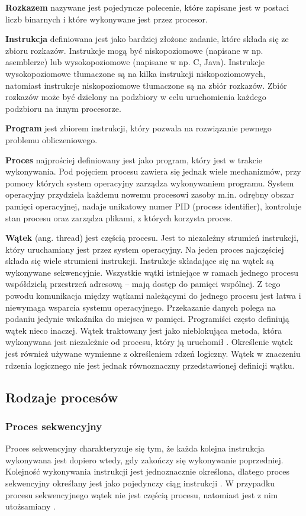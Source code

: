 \documentclass[12pt]{article}
\begin{document}
\textbf{Rozkazem} nazywane jest pojedyncze polecenie, które zapisane jest w postaci liczb binarnych i które
wykonywane jest przez procesor.

\textbf{Instrukcja} definiowana jest jako bardziej złożone zadanie, które składa się ze zbioru rozkazów. Instrukcje
mogą być niskopoziomowe (napisane w np. asemblerze) lub wysokopoziomowe (napisane w np. C, Java).
Instrukcje wysokopoziomowe tłumaczone są na kilka instrukcji niskopoziomowych, natomiast instrukcje
niskopoziomowe tłumaczone są na zbiór rozkazów. Zbiór rozkazów może być dzielony na podzbiory w celu
uruchomienia każdego podzbioru na innym procesorze.

\textbf{Program} jest zbiorem instrukcji, który pozwala na rozwiązanie pewnego problemu obliczeniowego. 

\textbf{Proces} najprościej definiowany jest jako program, który jest w trakcie wykonywania. Pod pojęciem procesu zawiera
się jednak wiele mechanizmów, przy pomocy których system operacyjny zarządza wykonywaniem programu.
System operacyjny przydziela każdemu nowemu procesowi zasoby m.in. odrębny obszar pamięci operacyjnej, nadaje
unikatowy numer PID (process identifier), kontroluje stan procesu oraz zarządza plikami, z których korzysta proces.

\textbf{Wątek} (ang. thread) jest częścią procesu. Jest to niezależny strumień instrukcji, który uruchamiany jest przez system operacyjny.
Na jeden proces najczęściej składa się wiele strumieni instrukcji. Instrukcje składające się na wątek są wykonywane sekwencyjnie.
Wszystkie wątki istniejące w ramach jednego procesu współdzielą przestrzeń adresową -- mają dostęp do pamięci wspólnej.
Z tego powodu komunikacja między wątkami należącymi do jednego procesu jest łatwa i niewymaga wsparcia systemu operacyjnego.
Przekazanie danych polega na podaniu jedynie wskaźnika do miejsca w pamięci.
Programiści często definiują wątek nieco inaczej. Wątek traktowany jest jako nieblokująca metoda, która wykonywana jest
niezależnie od procesu, który ją uruchomił \cite{programowanie-rozproszone-i-rownolegle}. Określenie wątek jest również używane
wymienne z określeniem rdzeń logiczny. Wątek w znaczeniu rdzenia logicznego nie jest jednak równoznaczny przedstawionej definicji wątku.

\subsection{Rodzaje procesów}

\subsubsection{Proces sekwencyjny}
Proces sekwencyjny charakteryzuje się tym, że każda kolejna instrukcja wykonywana jest dopiero wtedy, gdy zakończy
się wykonywanie poprzedniej. Kolejność wykonywania instrukcji jest jednoznacznie określona, dlatego proces sekwencyjny
określany jest jako pojedynczy ciąg instrukcji \cite{wprowadzenie-do-obliczen-rownoleglych}. W przypadku procesu sekwencyjnego
wątek nie jest częścią procesu, natomiast jest z nim utożsamiany \cite{skrypt}.
\end{document}
